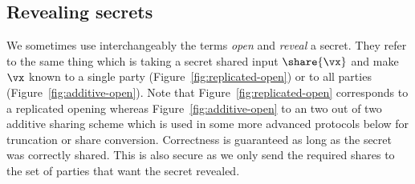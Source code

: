 \subsection{Revealing secrets}

We sometimes use interchangeably the terms \textit{open} and \textit{reveal} a secret.
They refer to the same thing which is taking a secret shared input $\share{\vx}$ and make $\vx$ known to
a single party (Figure~\ref{fig:replicated-open}) or to all parties (Figure~\ref{fig:additive-open}).
Note that Figure~\ref{fig:replicated-open} corresponds to a replicated opening whereas Figure~\ref{fig:additive-open} to an two out of two additive sharing scheme which is used in some more
advanced protocols below for truncation or share conversion. Correctness is guaranteed as long as
the secret was correctly shared. This is also secure as we only send the required
shares to the set of parties that want the secret revealed.

